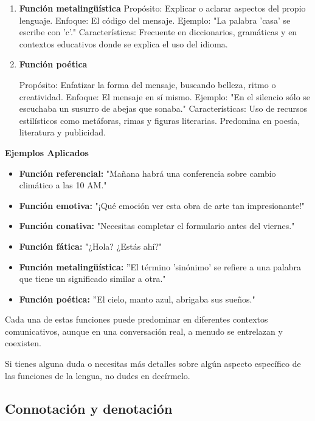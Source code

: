 \begin{enumerate}
      \item \textbf{Función metalingüística}
            Propósito: Explicar o aclarar aspectos del propio lenguaje.
            Enfoque: El código del mensaje.
            Ejemplo: "La palabra 'casa' se escribe con 'c'."
            Características: Frecuente en diccionarios, gramáticas y en contextos educativos donde se explica el uso del idioma.

      \item \textbf{Función poética}

            Propósito: Enfatizar la forma del mensaje, buscando belleza, ritmo o creatividad.
            Enfoque: El mensaje en sí mismo.
            Ejemplo: "En el silencio sólo se escuchaba un susurro de abejas que sonaba."
            Características: Uso de recursos estilísticos como metáforas, rimas y figuras literarias. Predomina en poesía, literatura y publicidad.
\end{enumerate}


\textbf{Ejemplos Aplicados}
\begin{itemize}
      \item \textbf{Función referencial:} "Mañana habrá una conferencia sobre cambio climático a las 10 AM."
      \item \textbf{Función emotiva:} "¡Qué emoción ver esta obra de arte tan impresionante!"
      \item \textbf{Función conativa:} "Necesitas completar el formulario antes del viernes."
      \item \textbf{Función fática:} "¿Hola? ¿Estás ahí?"
      \item \textbf{Función metalingüística:} ''El término 'sinónimo' se refiere a una palabra que tiene un significado similar a otra."
      \item \textbf{Función poética:} ''El cielo, manto azul, abrigaba sus sueños."
\end{itemize}

Cada una de estas funciones puede predominar en diferentes contextos comunicativos, aunque en una conversación real, a menudo se entrelazan y coexisten.

Si tienes alguna duda o necesitas más detalles sobre algún aspecto específico de las funciones de la lengua, no dudes en decírmelo.

\subsection{Connotación y denotación}

